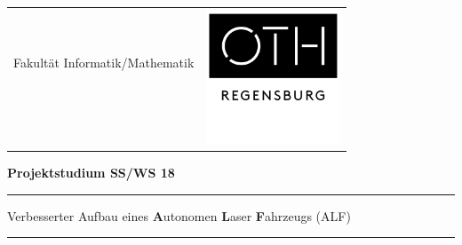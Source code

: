 

\titlepage

\begin{center}

\begin{tabular}{cc}
& \multirow{5}{*}{
\includegraphics[height=4.0cm]{images/cover_sheet/OTH_Regensburg_neues_Logo_01}}\tabularnewline

{\large{}Fakultät Informatik/Mathematik}\hspace{1.5cm} & \tabularnewline
 & \tabularnewline
 & \tabularnewline
 & \tabularnewline
\end{tabular}
\par\end{center}

\noindent 
\vspace{0.7cm}


\noindent \begin{center}
\textbf{\huge{}Projektstudium SS/WS 18}
\par\end{center}{\Large \par}


\noindent
\rule{\textwidth}{0.3pt}
\vspace{0.01cm}

\begin{doublespace}
\noindent \begin{center}
{\Large{Verbesserter Aufbau eines \textbf{A}utonomen \textbf{L}aser \textbf{F}ahrzeugs (ALF)}}
\par\end{center}{\large \par}
\end{doublespace}
\noindent\rule{\textwidth}{0.3pt}


\vspace{0.9cm}

\vspace{6.0cm}


